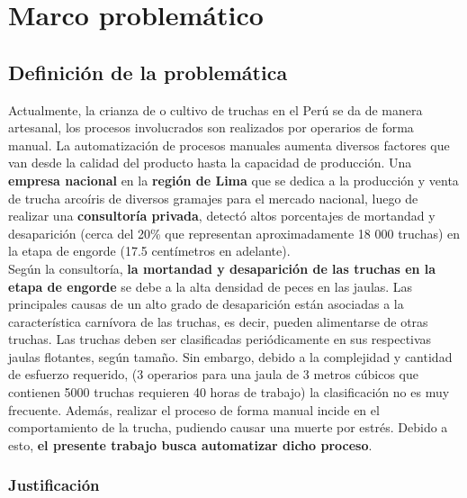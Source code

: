 

\doublespacing
\chapter{Marco problemático}
\section{Definición de la problemática}

Actualmente, la crianza de o cultivo de truchas en el Perú se da de manera artesanal, los procesos involucrados son realizados por operarios de forma manual. La automatización de procesos manuales aumenta diversos factores que van desde la calidad del producto hasta la capacidad de producción. Una \textbf{empresa nacional} en la \textbf{región de Lima} que se dedica a la producción y venta de trucha arcoíris de diversos gramajes para el mercado nacional, luego de realizar una \textbf{consultoría privada}, detectó altos porcentajes de mortandad y desaparición (cerca del 20\% que representan aproximadamente 18 000 truchas) en la etapa de engorde (17.5 centímetros en adelante).\\

Según la consultoría, \textbf{la mortandad y desaparición de las truchas en la etapa de engorde} se debe a la alta densidad de peces en las jaulas. Las principales causas de un alto grado de desaparición están asociadas a la característica carnívora de las truchas, es decir, pueden alimentarse de otras truchas. Las truchas deben ser clasificadas periódicamente en sus respectivas jaulas flotantes, según tamaño. Sin embargo, debido a la complejidad y cantidad de esfuerzo requerido, (3 operarios para una jaula de 3 metros cúbicos que contienen 5000 truchas requieren 40  horas de trabajo) la clasificación no es muy frecuente. Además, realizar el proceso de forma manual incide en el comportamiento de la trucha, pudiendo causar una muerte por estrés. Debido a esto, \textbf{el presente trabajo busca automatizar dicho proceso}.\\

\subsection{Justificación}

